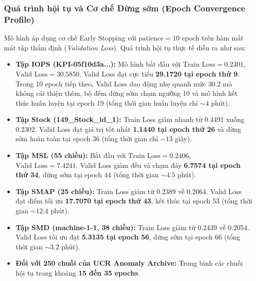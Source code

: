 \documentclass[11pt,journal,onecolumn]{IEEEtran}
\begin{document}
\subsubsection{Quá trình hội tụ và Cơ chế Dừng sớm (Epoch Convergence Profile)}
Mô hình áp dụng cơ chế Early Stopping với $\text{patience} = 10$ epoch trên hàm mất mát tập thẩm định (\textit{Validation Loss}). Quá trình hội tụ thực tế diễn ra như sau:
\begin{itemize}
    \item \textbf{Tập IOPS (KPI-05f10d3a...):} Mô hình bắt đầu với $\text{Train Loss} = 0.2301$, $\text{Valid Loss} = 30.5850$. Valid Loss đạt cực tiểu \textbf{29.1720 tại epoch thứ 9}. Trong 10 epoch tiếp theo, Valid Loss dao động nhẹ quanh mức 30.2 mà không cải thiện thêm, bộ đếm dừng sớm chạm ngưỡng 10 và mô hình kết thúc huấn luyện tại epoch 19 (tổng thời gian huấn luyện chỉ $\sim 4$ phút).
    \item \textbf{Tập Stock (149\_Stock\_id\_1):} Train Loss giảm nhanh từ 0.4491 xuống 0.2302. Valid Loss đạt giá trị tốt nhất \textbf{1.1440 tại epoch thứ 26} và dừng sớm hoàn toàn tại epoch 36 (tổng thời gian chỉ $\sim 13$ giây).
    \item \textbf{Tập MSL (55 chiều):} Bắt đầu với $\text{Train Loss} = 0.2406$, $\text{Valid Loss} = 7.4241$. Valid Loss giảm đều và chạm đáy \textbf{6.7574 tại epoch thứ 34}, dừng sớm tại epoch 44 (tổng thời gian $\sim 4.5$ phút).
    \item \textbf{Tập SMAP (25 chiều):} Train Loss giảm từ 0.2389 về 0.2064. Valid Loss đạt điểm tối ưu \textbf{17.7070 tại epoch thứ 43}, kết thúc tại epoch 53 (tổng thời gian $\sim 12.4$ phút).
    \item \textbf{Tập SMD (machine-1-1, 38 chiều):} Train Loss giảm từ 0.2439 về 0.2054. Valid Loss tối ưu đạt \textbf{5.3135 tại epoch 56}, dừng sớm tại epoch 66 (tổng thời gian $\sim 3.2$ phút).
    \item \textbf{Đối với 250 chuỗi của UCR Anomaly Archive:} Trung bình các chuỗi hội tụ trong khoảng \textbf{15 đến 35 epochs}.
\end{itemize}
\end{document}
